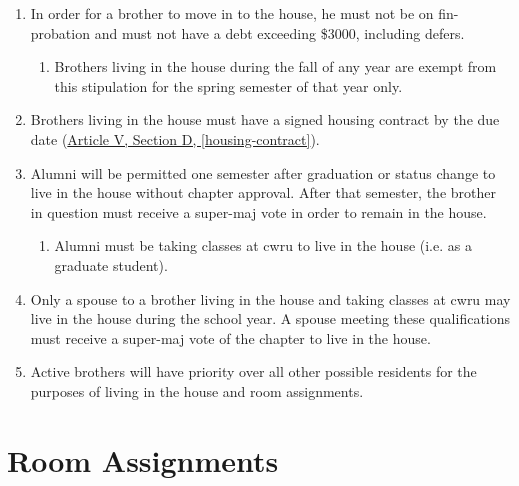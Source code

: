 \begin{enumerate}
		\item In order for a brother to move in to the house, he must not be on \gls{fin-probation} and must not have a debt exceeding \$3000, including \glspl{defer}.
        \begin{enumerate}
            \item Brothers living in the house during the fall of any year are exempt from this stipulation for the spring semester of that year only.
        \end{enumerate}

		\item Brothers living in the house must have a signed housing contract by the due date (\hyperref[housing-contract]{Article V, Section D, \autoref*{housing-contract}}). 

		\item Alumni will be permitted one semester after graduation or status change to live in the house without chapter approval. After that semester, the brother in question must receive a \gls{super-maj} vote in order to remain in the house. %
			\begin{enumerate}
				\item Alumni must be taking classes at \gls{cwru} to live in the house (i.e. as a graduate student).
			\end{enumerate}

		\item Only a spouse to a brother living in the house and taking classes at \gls{cwru} may live in the house during the school year. A spouse meeting these qualifications must receive a \gls{super-maj} vote of the chapter to live in the house.

		\item Active brothers will have priority over all other possible residents for the purposes of living in the house and room assignments.

	\end{enumerate}

\section{Room Assignments}
\label{housing}

